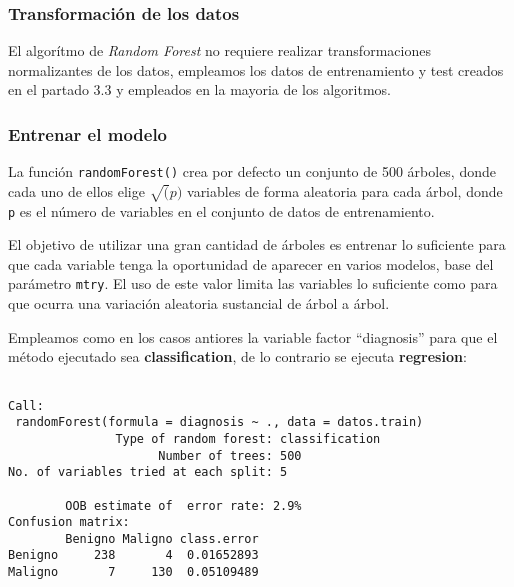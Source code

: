 \documentclass[
]{article}
\newenvironment{Shaded}{\begin{snugshade}}{\end{snugshade}}
\newcommand{\DataTypeTok}[1]{\textcolor[rgb]{0.13,0.29,0.53}{#1}}
\newcommand{\KeywordTok}[1]{\textcolor[rgb]{0.13,0.29,0.53}{\textbf{#1}}}
\newcommand{\NormalTok}[1]{#1}
\newcommand{\OperatorTok}[1]{\textcolor[rgb]{0.81,0.36,0.00}{\textbf{#1}}}
\newcommand{\StringTok}[1]{\textcolor[rgb]{0.31,0.60,0.02}{#1}}
\begin{document}
\hypertarget{transformaciuxf3n-de-los-datos-5}{%
\subsubsection{Transformación de los
datos}\label{transformaciuxf3n-de-los-datos-5}}

El algorítmo de \emph{Random Forest} no requiere realizar
transformaciones normalizantes de los datos, empleamos los datos de
entrenamiento y test creados en el partado 3.3 y empleados en la mayoria
de los algoritmos.

\hypertarget{entrenar-el-modelo-5}{%
\subsubsection{Entrenar el modelo}\label{entrenar-el-modelo-5}}

La función \texttt{randomForest()} crea por defecto un conjunto de 500
árboles, donde cada uno de ellos elige \(\sqrt(p)\) variables de forma
aleatoria para cada árbol, donde \texttt{p} es el número de variables en
el conjunto de datos de entrenamiento.

El objetivo de utilizar una gran cantidad de árboles es entrenar lo
suficiente para que cada variable tenga la oportunidad de aparecer en
varios modelos, base del parámetro \texttt{mtry}. El uso de este valor
limita las variables lo suficiente como para que ocurra una variación
aleatoria sustancial de árbol a árbol.

Empleamos como en los casos antiores la variable factor ``diagnosis''
para que el método ejecutado sea \textbf{classification}, de lo
contrario se ejecuta \textbf{regresion}:

\begin{Shaded}
\end{Shaded}

\begin{verbatim}

Call:
 randomForest(formula = diagnosis ~ ., data = datos.train) 
               Type of random forest: classification
                     Number of trees: 500
No. of variables tried at each split: 5

        OOB estimate of  error rate: 2.9%
Confusion matrix:
        Benigno Maligno class.error
Benigno     238       4  0.01652893
Maligno       7     130  0.05109489
\end{verbatim}
\end{document}
